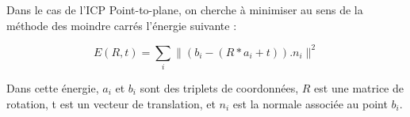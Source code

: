 Dans le cas de l'ICP Point-to-plane, on cherche à minimiser au sens de la méthode des moindre carrés l'énergie suivante :

\begin{equation}
E(R,t) = \sum_{i} \|(b_{i}-(R*a_{i} + t)).n_{i}\|^{2}
\end{equation}	

Dans cette énergie, $a_{i}$ et $b_{i}$ sont des triplets de coordonnées, $R$ est une matrice de rotation, t est un vecteur de translation, et $n_{i}$ est la normale associée au point $b_{i}$.


